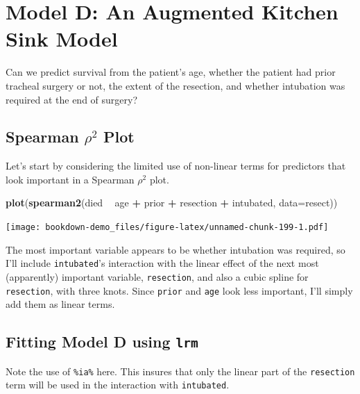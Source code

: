 \documentclass[]{book}
\newenvironment{Shaded}{\begin{snugshade}}{\end{snugshade}}
\newcommand{\KeywordTok}[1]{\textcolor[rgb]{0.13,0.29,0.53}{\textbf{#1}}}
\newcommand{\DataTypeTok}[1]{\textcolor[rgb]{0.13,0.29,0.53}{#1}}
\newcommand{\StringTok}[1]{\textcolor[rgb]{0.31,0.60,0.02}{#1}}
\newcommand{\OperatorTok}[1]{\textcolor[rgb]{0.81,0.36,0.00}{\textbf{#1}}}
\newcommand{\NormalTok}[1]{#1}
\theoremstyle{definition}
\theoremstyle{definition}
\theoremstyle{definition}
\theoremstyle{remark}
\begin{document}
\section{Model D: An Augmented Kitchen Sink
Model}\label{model-d-an-augmented-kitchen-sink-model}

Can we predict survival from the patient's age, whether the patient had
prior tracheal surgery or not, the extent of the resection, and whether
intubation was required at the end of surgery?

\subsection{\texorpdfstring{Spearman \(\rho^2\)
Plot}{Spearman \textbackslash{}rho\^{}2 Plot}}\label{spearman-rho2-plot}

Let's start by considering the limited use of non-linear terms for
predictors that look important in a Spearman \(\rho^2\) plot.

\begin{Shaded}
\begin{Highlighting}[]
\KeywordTok{plot}\NormalTok{(}\KeywordTok{spearman2}\NormalTok{(died }\OperatorTok{~}\StringTok{ }\NormalTok{age }\OperatorTok{+}\StringTok{ }\NormalTok{prior }\OperatorTok{+}\StringTok{ }\NormalTok{resection }\OperatorTok{+}\StringTok{ }\NormalTok{intubated, }\DataTypeTok{data=}\NormalTok{resect))}
\end{Highlighting}
\end{Shaded}

\texttt{[image: bookdown-demo\_files/figure-latex/unnamed-chunk-199-1.pdf]}

The most important variable appears to be whether intubation was
required, so I'll include \texttt{intubated}'s interaction with the
linear effect of the next most (apparently) important variable,
\texttt{resection}, and also a cubic spline for \texttt{resection}, with
three knots. Since \texttt{prior} and \texttt{age} look less important,
I'll simply add them as linear terms.

\subsection{\texorpdfstring{Fitting Model D using
\texttt{lrm}}{Fitting Model D using lrm}}\label{fitting-model-d-using-lrm}

Note the use of \texttt{\%ia\%} here. This insures that only the linear
part of the \texttt{resection} term will be used in the interaction with
\texttt{intubated}.
\end{document}
